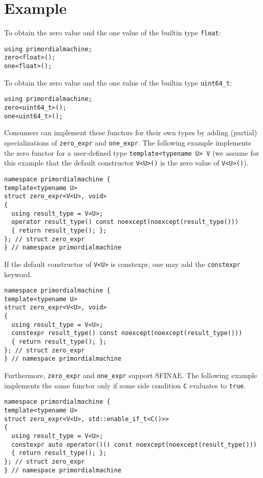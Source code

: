 \chapter{Example}
To obtain the zero value and the one value of the builtin type \verb+float+:
\begin{verbatim}
using primordialmachine;
zero<float>();
one<float>();
\end{verbatim}
To obtain the zero value and the one value of the builtin type \verb+uint64_t+:
\begin{verbatim}
using primordialmachine;
zero<uint64_t>();
one<uint64_t>();
\end{verbatim}

Consumers can implement these functors for their own types by adding (partial) specializations of \verb+zero_expr+ and \verb+one_expr+.
The following example implements the zero functor for a user-defined type \verb+template<typename U> V+ (we assume for this example
that the default constructor \verb+V<U>()+ is the zero value of \verb+V<U>()+).
\begin{verbatim}
namespace primordialmachine {
template<typename U>
struct zero_expr<V<U>, void>
{
  using result_type = V<U>;
  operator result_type() const noexcept(noexcept(result_type()))
  { return result_type(); };
}; // struct zero_expr
} // namespace primordialmachine
\end{verbatim}

If the default constructor of \verb+V<U>+ is constexpr, one may add the \verb+constexpr+ keyword.
\begin{verbatim}
namespace primordialmachine {
template<typename U>
struct zero_expr<V<U>, void>
{
  using result_type = V<U>;
  constexpr result_type() const noexcept(noexcept(result_type()))
  { return result_type(); };
}; // struct zero_expr
} // namespace primordialmachine
\end{verbatim}

Furthermore, \verb+zero_expr+ and \verb+one_expr+ support SFINAE.
The following example implements the same functor only if some side condition \verb+C+ evaluates to \verb+true+.
\begin{verbatim}
namespace primordialmachine {
template<typename U>
struct zero_expr<V<U>, std::enable_if_t<C()>>
{
  using result_type = V<U>;
  constexpr auto operator()() const noexcept(noexcept(result_type()))
  { return result_type(); };
}; // struct zero_expr
} // namespace primordialmachine
\end{verbatim}
